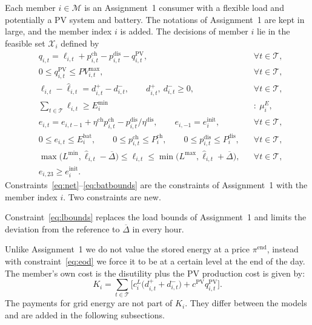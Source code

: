 Each member $i\in\mathcal{M}$ is an Assignment~1 consumer with a flexible load and potentially a PV system and battery.
The notations of Assignment~1 are kept in large, and the member index $i$ is added.
The decisions of member $i$ lie in the feasible set $\mathcal{X}_i$ defined by
\begin{subequations}\label{eq:member}
\begin{align}
& q_{i,t}=\ell_{i,t}+p^{\mathrm{ch}}_{i,t}-p^{\mathrm{dis}}_{i,t}-q^{\mathrm{PV}}_{i,t}, && \forall t\in\mathcal{T}, \label{eq:net}\\
& 0\le q^{\mathrm{PV}}_{i,t}\le PV^{\max}_{i,t}, && \forall t\in\mathcal{T}, \label{eq:pv}\\
& \ell_{i,t}-\hat{\ell}_{i,t}=d^{+}_{i,t}-d^{-}_{i,t},\qquad d^{+}_{i,t},\ d^{-}_{i,t}\ge 0, && \forall t\in\mathcal{T}, \label{eq:dev}\\
& \textstyle\sum_{t\in\mathcal{T}}\ell_{i,t}\ge E^{\min}_i && :\ \mu^{E}_i, \label{eq:emin}\\
& e_{i,t}=e_{i,t-1}+\eta^{\mathrm{ch}}p^{\mathrm{ch}}_{i,t}-p^{\mathrm{dis}}_{i,t}/\eta^{\mathrm{dis}},\qquad e_{i,-1}=e^{\mathrm{init}}_i, && \forall t\in\mathcal{T}, \label{eq:soc}\\
& 0\le e_{i,t}\le E^{\mathrm{bat}}_i,\qquad 0\le p^{\mathrm{ch}}_{i,t}\le P^{\mathrm{ch}}_i,\qquad 0\le p^{\mathrm{dis}}_{i,t}\le P^{\mathrm{dis}}_i, && \forall t\in\mathcal{T}, \label{eq:batbounds}\\
& \max\big(L^{\min},\hat{\ell}_{i,t}-\overline{\Delta}\big)\le \ell_{i,t}\le \min\big(L^{\max},\hat{\ell}_{i,t}+\overline{\Delta}\big), && \forall t\in\mathcal{T}, \label{eq:lbounds}\\
& e_{i,23}\ge e^{\mathrm{init}}_i. && \label{eq:eod}
\end{align}
\end{subequations}
Constraints~\eqref{eq:net}--\eqref{eq:batbounds} are the constraints of Assignment~1 with the member index $i$.
Two constraints are new.

Constraint~\eqref{eq:lbounds} replaces the load bounds of Assignment~1 and limits the deviation from the reference to $\overline{\Delta}$ in every hour.

Unlike Assignment~1 we do not value the stored energy at a price $\pi^{\mathrm{end}}$, instead with constraint~\eqref{eq:eod} we force it to be at a certain level at the end of the day.
The member's own cost is the disutility plus the PV production cost is given by:
\begin{equation}\label{eq:owncost}
K_i=\sum_{t\in\mathcal{T}}\Big[c^{L}_i\big(d^{+}_{i,t}+d^{-}_{i,t}\big)+c^{\mathrm{PV}}q^{\mathrm{PV}}_{i,t}\Big].
\end{equation}
The payments for grid energy are not part of $K_i$.
They differ between the models and are added in the following subsections.

